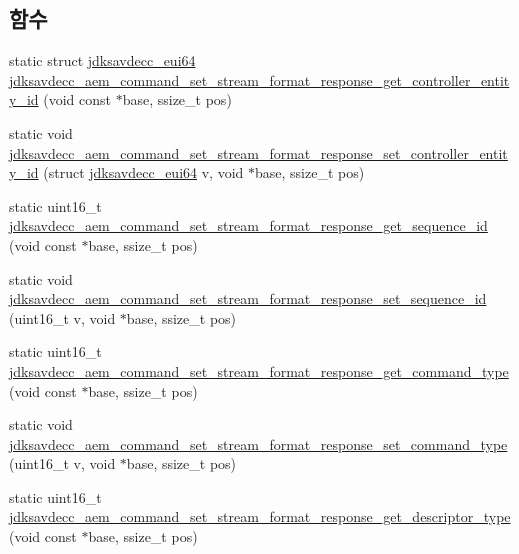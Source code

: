 \subsection*{함수}
\begin{DoxyCompactItemize}
\item 
static struct \hyperlink{structjdksavdecc__eui64}{jdksavdecc\+\_\+eui64} \hyperlink{group__command__set__stream__format__response_ga3846c08b14a8c5bc2b1aaec9ec2d9950}{jdksavdecc\+\_\+aem\+\_\+command\+\_\+set\+\_\+stream\+\_\+format\+\_\+response\+\_\+get\+\_\+controller\+\_\+entity\+\_\+id} (void const $\ast$base, ssize\+\_\+t pos)
\item 
static void \hyperlink{group__command__set__stream__format__response_gab6a2c31b90b8d0117c2192fdeecb88de}{jdksavdecc\+\_\+aem\+\_\+command\+\_\+set\+\_\+stream\+\_\+format\+\_\+response\+\_\+set\+\_\+controller\+\_\+entity\+\_\+id} (struct \hyperlink{structjdksavdecc__eui64}{jdksavdecc\+\_\+eui64} v, void $\ast$base, ssize\+\_\+t pos)
\item 
static uint16\+\_\+t \hyperlink{group__command__set__stream__format__response_gae5bc119c4504556b92b66fe42e73f78f}{jdksavdecc\+\_\+aem\+\_\+command\+\_\+set\+\_\+stream\+\_\+format\+\_\+response\+\_\+get\+\_\+sequence\+\_\+id} (void const $\ast$base, ssize\+\_\+t pos)
\item 
static void \hyperlink{group__command__set__stream__format__response_gaff9e759ac16c155a55b0e0004a90bacd}{jdksavdecc\+\_\+aem\+\_\+command\+\_\+set\+\_\+stream\+\_\+format\+\_\+response\+\_\+set\+\_\+sequence\+\_\+id} (uint16\+\_\+t v, void $\ast$base, ssize\+\_\+t pos)
\item 
static uint16\+\_\+t \hyperlink{group__command__set__stream__format__response_ga3d5706b1635759023be9903b07a50141}{jdksavdecc\+\_\+aem\+\_\+command\+\_\+set\+\_\+stream\+\_\+format\+\_\+response\+\_\+get\+\_\+command\+\_\+type} (void const $\ast$base, ssize\+\_\+t pos)
\item 
static void \hyperlink{group__command__set__stream__format__response_ga1d4bfe6dcc202cc0c6e9e5e58703b163}{jdksavdecc\+\_\+aem\+\_\+command\+\_\+set\+\_\+stream\+\_\+format\+\_\+response\+\_\+set\+\_\+command\+\_\+type} (uint16\+\_\+t v, void $\ast$base, ssize\+\_\+t pos)
\item 
static uint16\+\_\+t \hyperlink{group__command__set__stream__format__response_ga236db9fb302ab75ca2403531040254c8}{jdksavdecc\+\_\+aem\+\_\+command\+\_\+set\+\_\+stream\+\_\+format\+\_\+response\+\_\+get\+\_\+descriptor\+\_\+type} (void const $\ast$base, ssize\+\_\+t pos)
\item 

\end{DoxyCompactItemize}
